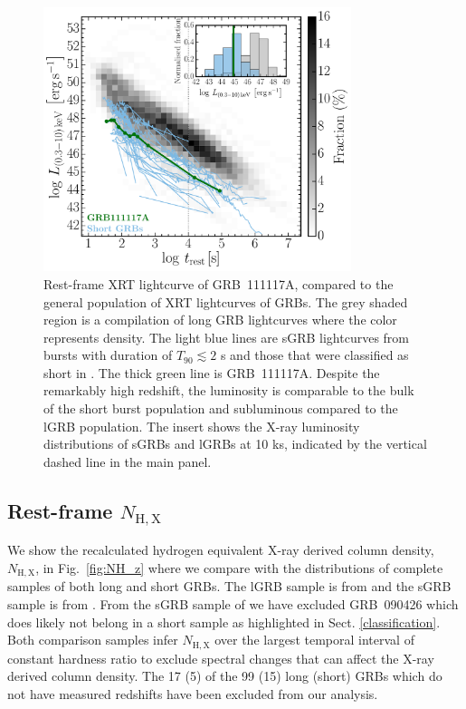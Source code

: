 \documentclass[referee]{aa}
\begin{document}
\begin{figure}
	\centering
	\includegraphics[width=9cm]{figures/XLC_111117A_rest.pdf}
	\caption{Rest-frame XRT lightcurve of GRB~111117A, compared to the general population of XRT lightcurves of GRBs. The grey shaded region is a compilation of long GRB lightcurves \citep{Evans2007, Evans2009} where the color represents density. The light blue lines are sGRB lightcurves from bursts with duration of $T_{90} \lesssim 2$ s and those that were classified as short in \citet{Kann2011, Berger2014, DAvanzo2014a}. The thick green line is GRB~111117A. Despite the remarkably high redshift, the luminosity is comparable to the bulk of the short burst population and subluminous compared to the lGRB population. The insert shows the X-ray luminosity distributions of sGRBs and lGRBs at 10 ks, indicated by the vertical dashed line in the main panel.}
	\label{fig:sxray_lightcurve}
\end{figure}

\subsection{Rest-frame $N_\mathrm{H,X}$ } \label{restnH}

We show the recalculated hydrogen equivalent X-ray derived column density,
$N_\mathrm{H,X}$, in Fig.~\ref{fig:NH_z} where we compare with the distributions
of complete samples of both long and short GRBs. The lGRB sample is from
\citet{Arcodia2016} and the sGRB sample is from \citet{DAvanzo2014a}. From the
sGRB sample of \citet{DAvanzo2014a} we have excluded GRB~090426 which does
likely not belong in a short sample as highlighted in Sect.
\ref{classification}. Both comparison samples infer $N_\mathrm{H,X}$  over the
largest temporal interval of constant hardness ratio to exclude spectral changes
that can affect the X-ray derived column density. The 17 (5) of the 99 (15) long
(short) GRBs which do not have measured redshifts have been excluded from our
analysis.
\end{document}
